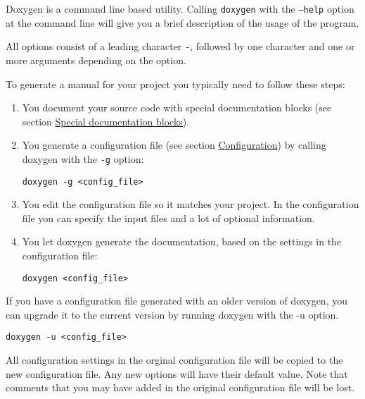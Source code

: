 Doxygen is a command line based utility. Calling {\tt doxygen} with the {\tt --help} option at the command line will give you a brief description of the usage of the program.

All options consist of a leading character {\tt -}, followed by one character and one or more arguments depending on the option.

To generate a manual for your project you typically need to follow these steps: \begin{enumerate}
\item You document your source code with special documentation blocks (see section \hyperlink{docblocks_specialblock}{Special documentation blocks}). \item You generate a configuration file (see section \hyperlink{config}{Configuration}) by calling doxygen with the {\tt -g} option: 

\footnotesize\begin{verbatim}
doxygen -g <config_file>
\end{verbatim}
\normalsize
 \item You edit the configuration file so it matches your project. In the configuration file you can specify the input files and a lot of optional information. \item You let doxygen generate the documentation, based on the settings in the configuration file: 

\footnotesize\begin{verbatim}
doxygen <config_file>
\end{verbatim}
\normalsize
 \end{enumerate}


If you have a configuration file generated with an older version of doxygen, you can upgrade it to the current version by running doxygen with the -u option. 

\footnotesize\begin{verbatim}
doxygen -u <config_file>
\end{verbatim}
\normalsize
 All configuration settings in the orginal configuration file will be copied to the new configuration file. Any new options will have their default value. Note that comments that you may have added in the original configuration file will be lost.

